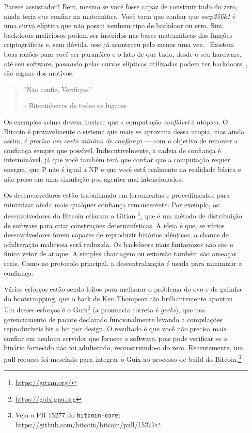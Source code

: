 Parece assustador? Bem, mesmo se você fosse capaz de construir tudo do zero, ainda teria que confiar na matemática. Você teria que confiar que \textit{secp256k1} é uma curva elíptica que não possui nenhum tipo de backdoor ou erro. Sim, backdoors maliciosos podem ser inseridos nas bases matemáticas das funções criptográficas e, sem dúvida, isso já aconteceu pelo menos uma vez.~\cite{wiki:Dual_EC_DRBG} Existem boas razões para você ser paranóico e o fato de que tudo, desde o seu hardware, até seu software, passando pelas curvas elípticas utilizadas podem ter backdoors~\cite{wiki:backdoors}, são alguns dos motivos.

\begin{quotation}\begin{samepage}
\enquote{Não confie. Verifique.}
\begin{flushright} -- Bitcoinheiros de todos os lugares
\end{flushright}\end{samepage}\end{quotation}

Os exemplos acima devem ilustrar que a computação \textit{confiável} é utópica. O Bitcoin é provavelmente o sistema que mais se aproxima dessa utopia, mas ainda assim, é \textit{preciso um certo mínimo de confiança} --- com o objetivo de remover a confiança sempre que possível. Indiscutivelmente, a cadeia de confiança é interminável, já que você também terá que confiar que a computação requer energia, que P não é igual a NP e que você está realmente na realidade básica e não preso em uma simulação por agentes mal-intencionados.

Os desenvolvedores estão trabalhando em ferramentas e procedimentos para minimizar ainda mais qualquer confiança remanescente. Por exemplo, os desenvolvedores do Bitcoin criaram o Gitian \footnote{\url{https://gitian.org/}}, que é um método de distribuição de software para criar construções determinísticas. A ideia é que, se vários desenvolvedores forem capazes de reproduzir binários idênticos, a chance de adulteração maliciosa será reduzida. Os backdoors mais fantasiosos não são o único vetor de ataque. A simples chantagem ou extorsão também são ameaças reais. Como no protocolo principal, a descentralização é usada para minimizar a confiança.

Vários esforços estão sendo feitos para melhorar o problema do ovo e da galinha do bootstrapping, que o hack de Ken Thompson tão brilhantemente apontou~\cite{web:bootstrapping}. Um desses esforços é o Guix\footnote{\url{https://guix.gnu.org}} (a pronuncia correta é \textit{geeks}), que usa gerenciamento de pacote declarado funcionalmente levando a compilações reproduzíveis bit a bit por design. O resultado é que você não precisa mais confiar em nenhum servidor que fornece o software, pois pode verificar se o binário fornecido não foi adulterado, reconstruindo-o do zero. Recentemente, um pull request foi mesclado para integrar o Guix ao processo de build do Bitcoin.\footnote{Veja o PR 15277 do \texttt{bitcoin-core}: \url{https://github.com/bitcoin/bitcoin/pull/15277}}

